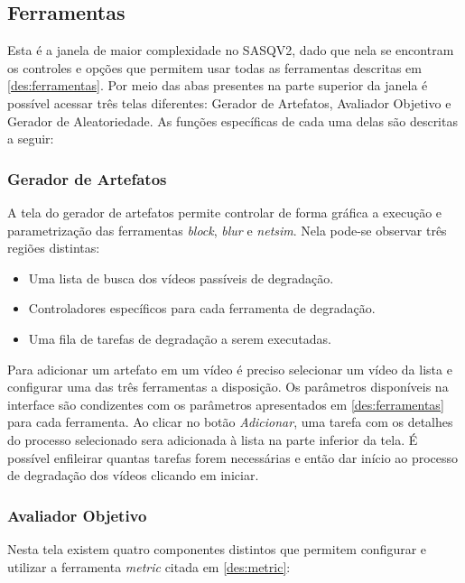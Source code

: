 
\subsection{Ferramentas}

Esta é a janela de maior complexidade no SASQV2, dado que nela se encontram os controles e opções que permitem usar todas as ferramentas descritas em \ref{des:ferramentas}. 
Por meio das abas presentes na parte superior da janela é possível acessar três telas diferentes: Gerador de Artefatos, Avaliador Objetivo e Gerador de Aleatoriedade. As funções específicas de cada uma delas são descritas a seguir:

\subsubsection{Gerador de Artefatos}

A tela do gerador de artefatos permite controlar de forma gráfica a execução e parametrização das ferramentas \emph{block}, \emph{blur} e \emph{netsim}. Nela pode-se observar três regiões distintas:

\begin{itemize}
	\item Uma lista de busca dos vídeos passíveis de degradação.
	\item Controladores específicos para cada ferramenta de degradação.
	\item Uma fila de tarefas de degradação a serem executadas.
\end{itemize}

Para adicionar um artefato em um vídeo é preciso selecionar um vídeo da lista e configurar uma das três ferramentas a disposição. 
Os parâmetros disponíveis na interface são condizentes com os parâmetros apresentados em \ref{des:ferramentas} para cada ferramenta.
Ao clicar no botão \emph{Adicionar}, uma tarefa com os detalhes do processo selecionado sera adicionada à lista na parte inferior da tela. É possível enfileirar quantas tarefas forem necessárias e então dar início ao processo de degradação dos vídeos clicando em iniciar.

\subsubsection{Avaliador Objetivo}

Nesta tela existem quatro componentes distintos que permitem configurar e utilizar a ferramenta \emph{metric} citada em \ref{des:metric}:

